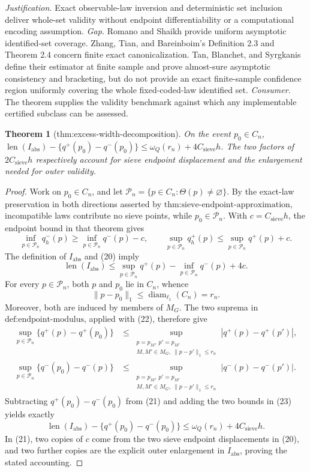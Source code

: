 \documentclass{article}
\newtheorem{theorem}{Theorem}
\begin{document}
\par\smallskip\noindent \textit{Justification.} Exact observable-law inversion and deterministic set inclusion deliver whole-set validity without endpoint differentiability or a computational encoding assumption. \textit{Gap.} Romano and Shaikh provide uniform asymptotic identified-set coverage. Zhang, Tian, and Bareinboim's Definition 2.3 and Theorem 2.4 concern finite exact canonicalization. Tan, Blanchet, and Syrgkanis define their estimator at finite sample and prove almost-sure asymptotic consistency and bracketing, but do not provide an exact finite-sample confidence region uniformly covering the whole fixed-coded-law identified set. \textit{Consumer.} The theorem supplies the validity benchmark against which any implementable certified subclass can be assessed.

\begin{theorem}[thm:excess-width-decomposition]\label{thm:excess-width-decomposition}
On the event \(p_0\in C_n\), \(\operatorname{len}(I_{\mathrm{abs}})-\{q^+(p_0)-q^-(p_0)\}\le\omega_Q(r_n)+4C_{\mathrm{sieve}}h\). The two factors of \(2C_{\mathrm{sieve}}h\) respectively account for sieve endpoint displacement and the enlargement needed for outer validity.
\end{theorem}
\begin{proof}
Work on \(p_0\in C_n\), and let \(\mathcal P_n=\{p\in C_n:\Theta(p)\ne\varnothing\}\).  By the exact-law preservation in both directions asserted by \(\text{thm:sieve-endpoint-approximation}\), incompatible laws contribute no sieve points, while \(p_0\in\mathcal P_n\).  With \(c=C_{\mathrm{sieve}}h\), the endpoint bound in that theorem gives
\[
\inf_{p\in\mathcal P_n}q_h^-(p)\geq\inf_{p\in\mathcal P_n}q^-(p)-c,
\qquad
\sup_{p\in\mathcal P_n}q_h^+(p)\leq\sup_{p\in\mathcal P_n}q^+(p)+c. \tag{20}
\]
The definition of \(I_{\mathrm{abs}}\) and (20) imply
\[
\operatorname{len}(I_{\mathrm{abs}})
\leq \sup_{p\in\mathcal P_n}q^+(p)-\inf_{p\in\mathcal P_n}q^-(p)+4c. \tag{21}
\]
For every \(p\in\mathcal P_n\), both \(p\) and \(p_0\) lie in \(C_n\), whence
\[
\lVert p-p_0\rVert_1\leq\operatorname{diam}_{\ell_1}(C_n)=r_n. \tag{22}
\]
Moreover, both are induced by members of \(M_G\).  The two suprema in \(\text{def:endpoint-modulus}\), applied with (22), therefore give
\[
\begin{aligned}
\sup_{p\in\mathcal P_n}\{q^+(p)-q^+(p_0)\}
&\leq \sup_{\substack{p=p_M,\ p'=p_{M'}\\M,M'\in M_G,\ \lVert p-p'\rVert_1\leq r_n}}
 |q^+(p)-q^+(p')|,\\
\sup_{p\in\mathcal P_n}\{q^-(p_0)-q^-(p)\}
&\leq \sup_{\substack{p=p_M,\ p'=p_{M'}\\M,M'\in M_G,\ \lVert p-p'\rVert_1\leq r_n}}
 |q^-(p)-q^-(p')|.
\end{aligned}                                                       \tag{23}
\]
Subtracting \(q^+(p_0)-q^-(p_0)\) from (21) and adding the two bounds in (23) yields exactly
\[
\operatorname{len}(I_{\mathrm{abs}})-\{q^+(p_0)-q^-(p_0)\}
\leq\omega_Q(r_n)+4C_{\mathrm{sieve}}h.
\]
In (21), two copies of \(c\) come from the two sieve endpoint displacements in (20), and two further copies are the explicit outer enlargement in \(I_{\mathrm{abs}}\), proving the stated accounting.
\end{proof}
\end{document}
